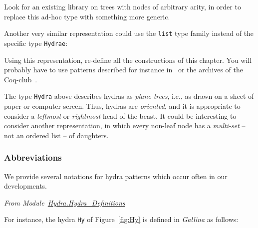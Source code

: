 



\begin{project}
Look for an existing library on trees with nodes of arbitrary arity, in order to replace  this ad-hoc type with something more generic.
\end{project}



\begin{project}

 Another very similar representation could use the \texttt{list} type family instead of the specific 
type \texttt{Hydrae}:




Using this representation, re-define all the constructions of this chapter.
You will probably have to use patterns described for instance in~\cite{BC04} or the archives of the Coq-club~\cite{Coq}.

  
\end{project}



\begin{project}
The type \texttt{Hydra} above describes hydras as \emph{plane trees}, i.e., as drawn on a sheet of paper or computer screen. Thus, hydras are \emph{oriented},
and it is appropriate to consider a \emph{leftmost} or \emph{rightmost} head of
the beast. It could be interesting to consider another representation, in which
every non-leaf node has a \emph{multi-set} -- not an ordered list -- of daughters.
\end{project}

\subsubsection{Abbreviations}

We provide several notations for hydra patterns  which occur often in our developments. 

\vspace{4pt}
\noindent
\emph{From Module~\href{../theories/html/hydras.Hydra.Hydra_Definitions.html\#head}{Hydra.Hydra\_Definitions}}




For instance, the hydra \texttt{Hy}  of Figure~\vref{fig:Hy} is defined in \emph{Gallina} as follows:

